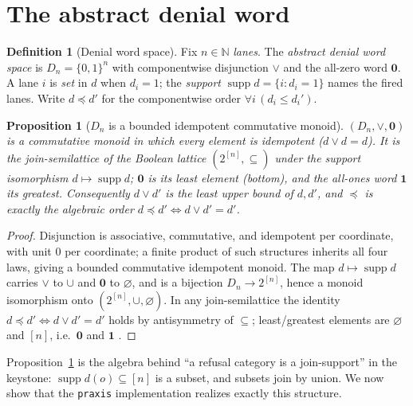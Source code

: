 \documentclass[11pt,oneside]{book}
\theoremstyle{definition}
\newtheorem{definition}{Definition}[chapter]
\theoremstyle{plain}
\newtheorem{proposition}[theorem]{Proposition}
\theoremstyle{remark}
\DeclareMathOperator{\supp}{supp}
\newcommand{\code}[1]{\texttt{#1}}
\newcommand{\Deny}{D}                 %
\begin{document}
\section{The abstract denial word}

\begin{definition}[Denial word space]\label{def:denialabstract}
Fix $n\in\mathbb{N}$ \emph{lanes}. %
The \emph{abstract denial word space} is $\Deny_n=\{0,1\}^{n}$ with componentwise disjunction $\lor$ and the all-zero word $\bm 0$. %
A lane $i$ is \emph{set} in $d$ when $d_i=1$; the \emph{support} $\supp d=\{i:d_i=1\}$ names the fired lanes. %
Write $d\preceq d'$ for the componentwise order $\forall i\, (d_i\le d_i')$. %
\end{definition}

\begin{proposition}[$\Deny_n$ is a bounded idempotent commutative monoid]\label{prop:monoid}
$(\Deny_n,\lor,\bm 0)$ is a commutative monoid in which every element is idempotent ($d\lor d=d$). %
It is the join-semilattice of the Boolean lattice $(2^{[n]},\subseteq)$ under the support isomorphism $d\mapsto\supp d$; $\bm 0$ is its least element (bottom), and the all-ones word $\bm 1$ its greatest. %
Consequently $d\lor d'$ is the least upper bound of $d,d'$, and $\preceq$ is exactly the algebraic order $d\preceq d'\iff d\lor d'=d'$. %
\end{proposition}

\begin{proof}
Disjunction is associative, commutative, and idempotent per coordinate, with unit $0$ per coordinate; a finite product of such structures inherits all four laws, giving a bounded commutative idempotent monoid. %
The map $d\mapsto\supp d$ carries $\lor$ to $\cup$ and $\bm 0$ to $\varnothing$, and is a bijection $\Deny_n\to 2^{[n]}$, hence a monoid isomorphism onto $(2^{[n]},\cup,\varnothing)$. %
In any join-semilattice the identity $d\preceq d'\iff d\lor d'=d'$ holds by antisymmetry of $\subseteq$; least/greatest elements are $\varnothing$ and $[n]$, i.e.\ $\bm 0$ and $\bm 1$ \cite[Ch.~I]{birkhoff1967}. %
\end{proof}

Proposition~\ref{prop:monoid} is the algebra behind ``a refusal category is a join-support'' in the keystone: $\supp d(o)\subseteq[n]$ is a subset, and subsets join by union. %
We now show that the \code{praxis} implementation realizes exactly this structure. %
\end{document}
